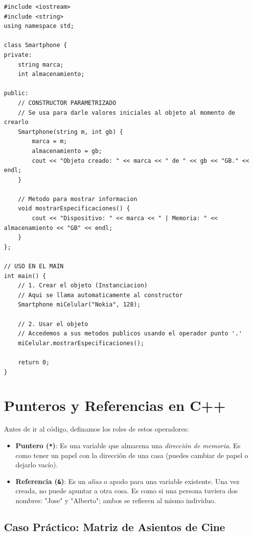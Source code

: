 \documentclass{article}
\begin{document}
\begin{lstlisting}
#include <iostream>
#include <string>
using namespace std;

class Smartphone {
private:
    string marca;
    int almacenamiento;

public:
    // CONSTRUCTOR PARAMETRIZADO
    // Se usa para darle valores iniciales al objeto al momento de crearlo
    Smartphone(string m, int gb) {
        marca = m;
        almacenamiento = gb;
        cout << "Objeto creado: " << marca << " de " << gb << "GB." << endl;
    }

    // Metodo para mostrar informacion
    void mostrarEspecificaciones() {
        cout << "Dispositivo: " << marca << " | Memoria: " << almacenamiento << "GB" << endl;
    }
};

// USO EN EL MAIN
int main() {
    // 1. Crear el objeto (Instanciacion)
    // Aqui se llama automaticamente al constructor
    Smartphone miCelular("Nokia", 128);

    // 2. Usar el objeto
    // Accedemos a sus metodos publicos usando el operador punto '.'
    miCelular.mostrarEspecificaciones();

    return 0;
}
\end{lstlisting}



\section{Punteros y Referencias en C++}

Antes de ir al código, definamos los roles de estos operadores:

\begin{itemize}
    \item \textbf{Puntero (\texttt{*})}: Es una variable que almacena una \textit{dirección de memoria}. Es como tener un papel con la dirección de una casa (puedes cambiar de papel o dejarlo vacío).
    \item \textbf{Referencia (\texttt{\&})}: Es un \textit{alias} o apodo para una variable existente. Una vez creada, no puede apuntar a otra cosa. Es como si una persona tuviera dos nombres: "Jose" y "Alberto"; ambos se refieren al mismo individuo.
\end{itemize}

\subsection{Caso Práctico: Matriz de Asientos de Cine}
\end{document}
